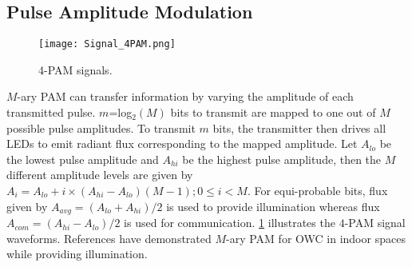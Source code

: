 \subsection{Pulse Amplitude Modulation}
\label{subsec:sisoModulationPAM}
\begin{figure}[t]
	\centering
		\texttt{[image: Signal\_4PAM.png]}
		\caption{4-PAM signals.}
		\label{fig:sisoSig4PAM}
\end{figure}
$M$-ary PAM can transfer information by varying the amplitude of each transmitted pulse. $m$=log$^{ }_{2}(M)$ bits to transmit are mapped to one out of $M$ possible pulse amplitudes. To transmit $m$ bits, the transmitter then drives all LEDs to emit radiant flux corresponding to the mapped amplitude. Let $A_{lo}$ be the lowest pulse amplitude and $A_{hi}$ be the highest pulse amplitude, then the $M$ different amplitude levels are given by $A_{i} = A_{lo} + i\times(A_{hi}-A_{lo})(M-1); 0\leq i<M$. For equi-probable bits, flux given by $A_{avg} = (A_{lo} + A_{hi})/2$ is used to provide illumination whereas flux $A_{com} = (A_{hi}-A_{lo})/2$ is used for communication. \figurename{ \ref{fig:sisoSig4PAM}} illustrates the $4$-PAM signal waveforms. References \cite{gru08b} have demonstrated $M$-ary PAM for OWC in indoor spaces while providing illumination.


